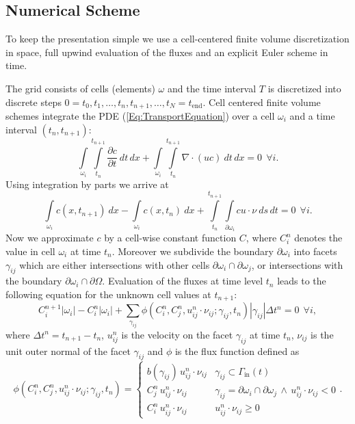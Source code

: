 \documentclass[11pt,a4paper,headinclude,footinclude,DIV16,headings=normal]{scrreprt}
\begin{document}
\subsection{Numerical Scheme}

To keep the presentation simple we use a cell-centered finite volume
discretization in space, full upwind evaluation of the fluxes and an
explicit Euler scheme in time.

The grid consists of cells (elements) $\omega$ and the time interval
$T$ is discretized into discrete steps $0=t_0, t_1, \ldots, t_n,
t_{n+1},\ldots, t_N=t_{\text{end}}$. Cell centered finite volume schemes
integrate the PDE (\ref{Eq:TransportEquation}) over a cell $\omega_i$
and a time interval $(t_n,t_{n+1})$:
\begin{equation}
\int\limits_{\omega_i}\int\limits_{t_n}^{t_{n+1}}\frac{\partial
  c}{\partial t}\ dt\,dx +
\int\limits_{\omega_i}\int\limits_{t_n}^{t_{n+1}} \nabla\cdot (uc) \
dt\,dx = 0 \ \ \forall i.
\label{Eq:TransportEquationIntegrated}
\end{equation}
Using integration by parts we arrive at
\begin{equation}
\int\limits_{\omega_i} c(x,t_{n+1})\ dx - \int\limits_{\omega_i}
c(x,t_{n})\ dx + \int\limits_{t_n}^{t_{n+1}}
\int\limits_{\partial\omega_i} c u\cdot\nu\ ds\,dt = 0 \ \ \forall i.
\end{equation}
Now we approximate $c$ by a cell-wise constant function $C$, where
$C_i^n$ denotes the value in cell $\omega_i$ at time $t_n$.
Moreover we subdivide the boundary $\partial\omega_i$ into
facets $\gamma_{ij}$ which are either intersections with
other cells $\partial\omega_i\cap\partial\omega_j$,
or intersections with the boundary
$\partial\omega_i\cap\partial\Omega$.
Evaluation of the fluxes
at time level $t_n$ leads to the following equation for the unknown
cell values at $t_{n+1}$:
\begin{equation}
C_i^{n+1}|\omega_i| - C_i^{n}|\omega_i| + \sum\limits_{\gamma_{ij}}
\phi(C_i^n, C_j^n, u_{ij}^n\cdot\nu_{ij}; \gamma_{ij}, t_n )
|\gamma_{ij}| \Delta t^n = 0 \ \ \forall i,
\label{Eq:DiscreteForm}
\end{equation}
where $\Delta t^n=t_{n+1}-t_n$, $u_{ij}^n$ is the velocity on the facet $\gamma_{ij}$ at time
$t_n$, $\nu_{ij}$ is the unit outer normal of the facet $\gamma_{ij}$ and $\phi$ is the flux function defined as
\begin{equation}
\phi(C_i^n, C_j^n, u_{ij}^n\cdot\nu_{ij}; \gamma_{ij}, t_n ) =
\left\{\begin{array}{ll}
b(\gamma_{ij})\, u_{ij}^n\cdot\nu_{ij} & \gamma_{ij} \subset \Gamma_{\text{in}}(t) \\
C_j^n\, u_{ij}^n\cdot\nu_{ij}&
\gamma_{ij}=\partial\omega_i\cap\partial\omega_j\,\wedge\,u_{ij}^n\cdot\nu_{ij} < 0\\
C_i^n\, u_{ij}^n\cdot\nu_{ij}& u_{ij}^n\cdot\nu_{ij} \geq 0
\end{array}\right..
\end{equation}
\end{document}
